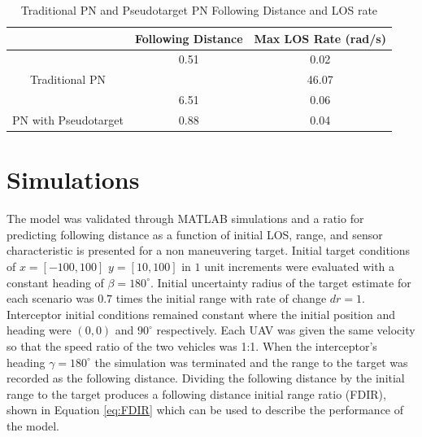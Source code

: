 \documentclass[conference]{IEEEtran}
\begin{document}
\begin{table}[H]
	\centering
	\caption{Traditional PN and Pseudotarget PN Following Distance and LOS rate}
	\label{my-label}
	\begin{tabular}{c|c|c|}
		\cline{2-3}
		\multicolumn{1}{l|}{}                                        & \multicolumn{1}{l|}{Following Distance} & \multicolumn{1}{l|}{Max LOS Rate (rad/s)} \\ \hline
		\multicolumn{1}{|c|}{}                                       & 0.51                                    & 0.02                                      \\ \cline{2-3} 
		\multicolumn{1}{|c|}{\multirow{-2}{*}{Traditional PN}}       & \cellcolor[HTML]{C0C0C0}                & 46.07                                     \\ \hline
		\multicolumn{1}{|c|}{}                                       & 6.51                                    & 0.06                                      \\ \cline{2-3} 
		\multicolumn{1}{|c|}{\multirow{-2}{*}{PN with Pseudotarget}} & 0.88                                    & 0.04                                      \\ \hline
	\end{tabular}
\end{table}

\section{Simulations}
The model was validated through MATLAB simulations and a ratio for predicting following distance as a function of initial LOS, range, and sensor characteristic is presented for a non maneuvering target. Initial target conditions of $x = [-100,100]$ $y = [10,100]$ in $1$ unit increments were evaluated with a constant heading of $\beta = 180^{\circ}$. Initial uncertainty radius of the target estimate for each scenario was $0.7$ times the initial range with rate of change $dr = 1$. Interceptor initial conditions remained constant where the initial position and heading were $(0,0)$ and $90^{\circ}$ respectively. Each UAV was given the same velocity so that the speed ratio of the two vehicles was 1:1. When the interceptor's heading $\gamma = 180^{\circ}$ the simulation was terminated and the range to the target was recorded as the following distance. Dividing the following distance by the initial range to the target produces a following distance initial range ratio (FDIR), shown in Equation \ref{eq:FDIR} which can be used to describe the performance of the model.
\end{document}
